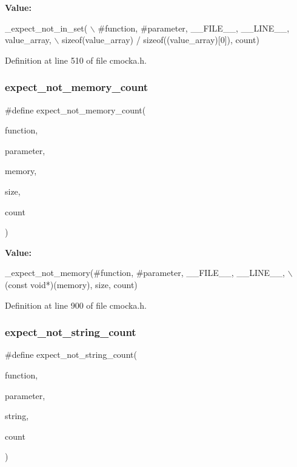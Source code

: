 {\bfseries Value\+:}
\begin{DoxyCode}
\_expect\_not\_in\_set( \(\backslash\)
        #\textcolor{keyword}{function}, #parameter, \_\_FILE\_\_, \_\_LINE\_\_, value\_array, \(\backslash\)
        \textcolor{keyword}{sizeof}(value\_array) / \textcolor{keyword}{sizeof}((value\_array)[0]), count)
\end{DoxyCode}


Definition at line 510 of file cmocka.\+h.

\mbox{\label{group__cmocka__param_gaf5070a1bb6a92d1b3ad0d082bb2e153b}} 
\subsubsection{\texorpdfstring{expect\+\_\+not\+\_\+memory\+\_\+count}{expect\_not\_memory\_count}}
{\footnotesize\ttfamily \#define expect\+\_\+not\+\_\+memory\+\_\+count(\begin{DoxyParamCaption}\item[{}]{function,  }\item[{}]{parameter,  }\item[{}]{memory,  }\item[{}]{size,  }\item[{}]{count }\end{DoxyParamCaption})}

{\bfseries Value\+:}
\begin{DoxyCode}
\_expect\_not\_memory(#\textcolor{keyword}{function}, #parameter, \_\_FILE\_\_, \_\_LINE\_\_, \(\backslash\)
                       (\textcolor{keyword}{const} \textcolor{keywordtype}{void}*)(memory), size, count)
\end{DoxyCode}


Definition at line 900 of file cmocka.\+h.

\mbox{\label{group__cmocka__param_ga5c2e1017bdeeec2cd95071073b57886e}} 
\subsubsection{\texorpdfstring{expect\+\_\+not\+\_\+string\+\_\+count}{expect\_not\_string\_count}}
{\footnotesize\ttfamily \#define expect\+\_\+not\+\_\+string\+\_\+count(\begin{DoxyParamCaption}\item[{}]{function,  }\item[{}]{parameter,  }\item[{}]{string,  }\item[{}]{count }\end{DoxyParamCaption})}

